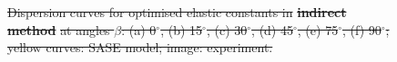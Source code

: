 \documentclass[preprint,12pt]{elsarticle}
\providecommand{\DIFdeltex}[1]{{\protect\color{red}\sout{#1}}}                      %
\providecommand{\DIFdelbegin}{} %
\providecommand{\DIFdelFL}[1]{\DIFdel{#1}} %
\providecommand{\DIFaddbeginFL}{} %
\providecommand{\DIFaddendFL}{} %
\providecommand{\DIFdelendFL}{} %
\providecommand{\DIFdel}[1]{\texorpdfstring{\DIFdeltex{#1}}{}} %
\begin{document}
\begin{figure} [h!]
{%
}
{%
}
{%
}
{%
\DIFdelFL{Dispersion curves for optimised elastic constants in }\textbf{\DIFdelFL{indirect method}} %
\DIFdelFL{at angles $\beta$: (a) 0$^{\circ}$, (b) 15$^{\circ}$, (c) 30$^{\circ}$, (d) 45$^{\circ}$, (e) 75$^{\circ}$, (f) 90$^{\circ}$; yellow curves: SASE model; image: experiment. }}
\DIFdelendFL \DIFaddbeginFL \label{fig:SH0_problem}
\DIFaddendFL \end{figure}

\DIFdelbegin %
\end{document}
